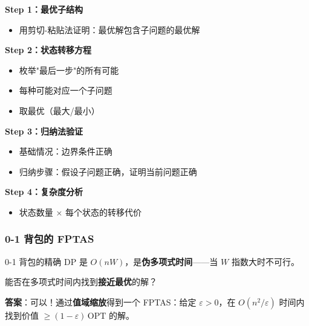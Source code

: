 \documentclass[12pt, a4paper]{ctexart}
\begin{document}
\begin{keypoint}[DP 证明的通用框架]

\textbf{Step 1：最优子结构}
\begin{itemize}
    \item 用剪切-粘贴法证明：最优解包含子问题的最优解
\end{itemize}

\textbf{Step 2：状态转移方程}
\begin{itemize}
    \item 枚举"最后一步"的所有可能
    \item 每种可能对应一个子问题
    \item 取最优（最大/最小）
\end{itemize}

\textbf{Step 3：归纳法验证}
\begin{itemize}
    \item 基础情况：边界条件正确
    \item 归纳步骤：假设子问题正确，证明当前问题正确
\end{itemize}

\textbf{Step 4：复杂度分析}
\begin{itemize}
    \item 状态数量 × 每个状态的转移代价
\end{itemize}

\end{keypoint}

\subsubsection{0-1 背包的 FPTAS}

\begin{blackboard}

0-1 背包的精确 DP 是 $O(nW)$，是\textbf{伪多项式时间}——当 $W$ 指数大时不可行。

能否在多项式时间内找到\textbf{接近最优}的解？

\textbf{答案}：可以！通过\textbf{值域缩放}得到一个 FPTAS：给定 $\varepsilon > 0$，在 $O(n^2/\varepsilon)$ 时间内找到价值 $\geq (1-\varepsilon)\,\mathrm{OPT}$ 的解。

\end{blackboard}
\end{document}
